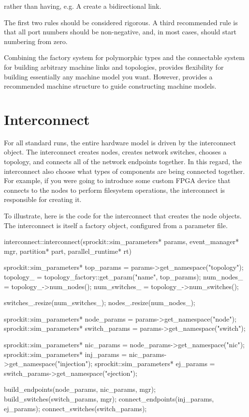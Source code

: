 rather than having, e.g. A create a bidirectional link.

The first two rules should be considered rigorous. 
A third recommended rule is that all port numbers should be non-negative, and, in most cases, should start numbering from zero.


Combining the factory system for polymorphic types and the connectable system for building arbitrary machine links and topologies,
\sstmacro provides flexibility for building essentially any machine model you want.
However, \sstmacro provides a recommended machine structure to guide constructing machine models.

\section{Interconnect}\label{sec:topInterconnect}
For all standard runs, the entire hardware model is driven by the interconnect object.
The interconnect creates nodes, creates network switches, chooses a topology, and connects all of the network endpoints together.
In this regard, the interconnect also choose what types of components are being connected together.
For example, if you were going to introduce some custom FPGA device that connects to the nodes to perform filesystem operations,
the interconnect is responsible for creating it.

To illustrate, here is the code for the interconnect that creates the node objects. 
The interconnect is itself a factory object, configured from a parameter file.

\begin{CppCode}
interconnect::interconnect(sprockit::sim_parameters* params, event_manager* mgr, partition* part, parallel_runtime* rt)
{
  sprockit::sim_parameters* top_params = params->get_namespace("topology");
  topology_ = topology_factory::get_param("name", top_params);
  num_nodes_ = topology_->num_nodes();
  num_switches_ = topology_->num_switches();
  
  switches_.resize(num_switches_);
  nodes_.resize(num_nodes_);

  sprockit::sim_parameters* node_params = params->get_namespace("node");
  sprockit::sim_parameters* switch_params = params->get_namespace("switch");
  
  sprockit::sim_parameters* nic_params = node_params->get_namespace("nic");
  sprockit::sim_parameters* inj_params = nic_params->get_namespace("injection");
  sprockit::sim_parameters* ej_params = switch_params->get_namespace("ejection"); 
  
  build_endpoints(node_params, nic_params, mgr);
  build_switches(switch_params, mgr);
  connect_endpoints(inj_params, ej_params);
  connect_switches(switch_params); 
}
\end{CppCode}

